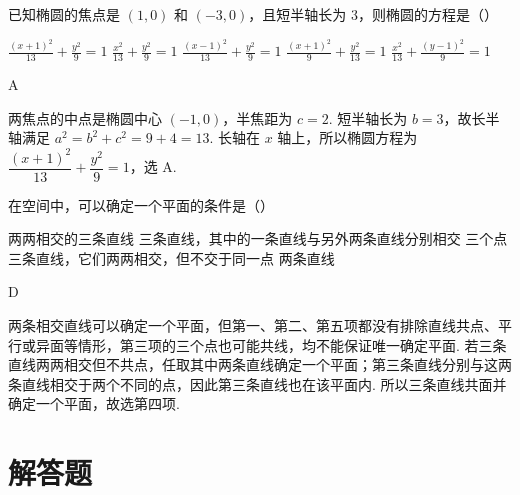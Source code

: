 \documentclass[UTF8,a4paper,oneside,11pt]{ctexbook}
\begin{document}
\begin{problem}

已知椭圆的焦点是 \((1, 0)\) 和 \((-3, 0)\)，且短半轴长为 3，则椭圆的方程是（\quad）

\choicesfive
    {\(\frac{(x + 1)^2}{13} + \frac{y^2}{9} = 1\)}
    {\(\frac{x^2}{13} + \frac{y^2}{9} = 1\)}
    {\(\frac{(x - 1)^2}{13} + \frac{y^2}{9} = 1\)}
    {\(\frac{(x + 1)^2}{9} + \frac{y^2}{13} = 1\)}
    {\(\frac{x^2}{13} + \frac{(y - 1)^2}{9} = 1\)}
\begin{answer}
A
\end{answer}

\begin{solution}
两焦点的中点是椭圆中心 \((-1,0)\)，半焦距为 \(c=2\). 短半轴长为 \(b=3\)，故长半轴满足 \(a^{2}=b^{2}+c^{2}=9+4=13\). 长轴在 \(x\) 轴上，所以椭圆方程为
\(\dfrac{(x+1)^{2}}{13}+\dfrac{y^{2}}9=1\)，选 A.
\end{solution}
\end{problem}

\begin{problem}

在空间中，可以确定一个平面的条件是（\quad）

\choicesfive
    {两两相交的三条直线}
    {三条直线，其中的一条直线与另外两条直线分别相交}
    {三个点}
    {三条直线，它们两两相交，但不交于同一点}
    {两条直线}
\begin{answer}
D
\end{answer}

\begin{solution}
两条相交直线可以确定一个平面，但第一、第二、第五项都没有排除直线共点、平行或异面等情形，第三项的三个点也可能共线，均不能保证唯一确定平面.
若三条直线两两相交但不共点，任取其中两条直线确定一个平面；第三条直线分别与这两条直线相交于两个不同的点，因此第三条直线也在该平面内. 所以三条直线共面并确定一个平面，故选第四项.
\end{solution}
\end{problem}

\section{解答题}
\end{document}
